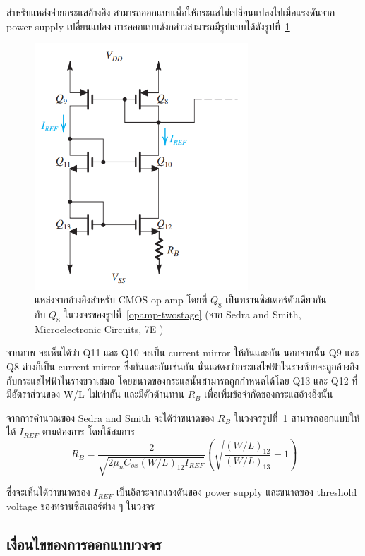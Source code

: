 \documentclass[a4paper, 11pt, oneside]{book} %
\begin{document}
สำหรับแหล่งจ่ายกระแสอ้างอิง สามารถออกแบบเพื่อให้กระแสไม่เปลี่ยนแปลงไปเมื่อแรงดันจาก power supply เปลี่ยนแปลง การออกแบบดังกล่าวสามารถมีรูปแบบได้ดังรูปที่~\ref{bias_circuit}

\begin{figure}[h]
    \centering
    \includegraphics[width = 8cm]{bias_circuit}
    \caption{แหล่งจากอ้างอิงสำหรับ CMOS op amp โดยที่ $Q_8$ เป็นทรานซิสเตอร์ตัวเดียวกันกับ $Q_8$ ในวงจรของรูปที่~\ref{opamp-twostage} (จาก Sedra and Smith, Microelectronic Circuits, 7E \cite{Sedra15})}
    \label{bias_circuit}
\end{figure}

จากภาพ จะเห็นได้ว่า Q11 และ Q10 จะเป็น current mirror ให้กันและกัน นอกจากนั้น Q9 และ Q8 ต่างก็เป็น current mirror ซึ่งกันและกันเช่นกัน นั่นแสดงว่ากระแสไฟฟ้าในรางซ้ายจะถูกอ้างอิงกับกระแสไฟฟ้าในรางขวาเสมอ โดยขนาดของกระแสนั้นสามารถถูกกำหนดได้โดย Q13 และ Q12 ที่มีอัตราส่วนของ W/L ไม่เท่ากัน และมีตัวต้านทาน $R_B$ เพื่อเพิ่มข้อจำกัดของกระแสอ้างอิงนั้น

จากการคำนวณของ Sedra and Smith \cite{Sedra15} จะได้ว่าขนาดของ $R_B$ ในวงจรรูปที่~\ref{bias_circuit} สามารถออกแบบให้ได้ $I_{REF}$ ตามต้องการ โดยใช้สมการ
\begin{equation}
    R_B = \frac{2}{\sqrt{2\mu_nC_{ox}(W/L)_{12}I_{REF}}}(\sqrt{\frac{(W/L)_{12}}{(W/L)_{13}}} - 1)
    \label{bias_resistor}
\end{equation}

ซึ่งจะเห็นได้ว่าขนาดของ $I_{REF}$ เป็นอิสระจากแรงดันของ power supply และขนาดของ threshold voltage ของทรานซิสเตอร์ต่าง ๆ ในวงจร

\subsection{เงื่อนไขของการออกแบบวงจร}
\end{document}
